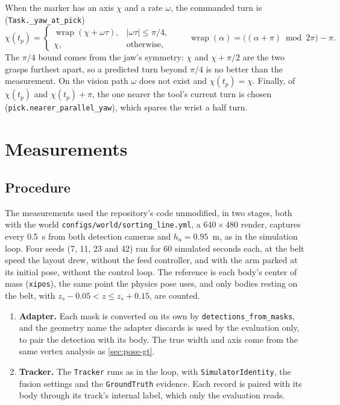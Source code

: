 \documentclass[11pt,a4paper]{article}
\theoremstyle{definition}
\theoremstyle{remark}
\newcommand{\code}[1]{\texttt{#1}}
\newcommand{\wrap}{\operatorname{wrap}}
\begin{document}
When the marker has an axis $\chi$ and a rate $\omega$, the commanded turn is
(\code{Task.\_yaw\_at\_pick})
\begin{equation}
\chi(t_p) =
\begin{cases}
\wrap(\chi + \omega\tau), & |\omega\tau| \le \pi/4,\\
\chi, & \text{otherwise},
\end{cases}
\qquad \wrap(\alpha) = \bigl((\alpha+\pi) \bmod 2\pi\bigr) - \pi .
\end{equation}
The $\pi/4$ bound comes from the jaw's symmetry: $\chi$ and $\chi+\pi/2$ are the
two grasps furthest apart, so a predicted turn beyond $\pi/4$ is no better than
the measurement. On the vision path $\omega$ does not exist and
$\chi(t_p) = \chi$. Finally, of $\chi(t_p)$ and $\chi(t_p)+\pi$, the one nearer
the tool's current turn is chosen (\code{pick.nearer\_parallel\_yaw}), which
spares the wrist a half turn.

\section{Measurements}
\label{sec:measurements}

\subsection{Procedure}

The measurements used the repository's code unmodified, in two stages, both
with the world \code{configs/world/sorting\_line.yml}, a $640\times480$ render,
captures every 0.5~s from both detection cameras and $h_a = 0.95$~m, as in the
simulation loop. Four seeds (7, 11, 23 and 42) ran for 60 simulated seconds
each, at the belt speed the layout drew, without the feed controller, and with
the arm parked at its initial pose, without the control loop. The reference is
each body's center of mass (\code{xipos}), the same point the physics pose uses,
and only bodies resting on the belt, with $z_s - 0.05 < z \le z_s + 0.15$, are
counted.

\begin{enumerate}[leftmargin=*]
\item \textbf{Adapter.} Each mask is converted on its own by
  \code{detections\_from\_masks}, and the geometry name the adapter discards is
  used by the evaluation only, to pair the detection with its body. The true
  width and axis come from the same vertex analysis as \cref{sec:pose-gt}.
\item \textbf{Tracker.} The \code{Tracker} runs as in the loop, with
  \code{SimulatorIdentity}, the fusion settings and the \code{GroundTruth}
  evidence. Each record is paired with its body through its track's internal
  label, which only the evaluation reads.
\end{enumerate}
\end{document}
